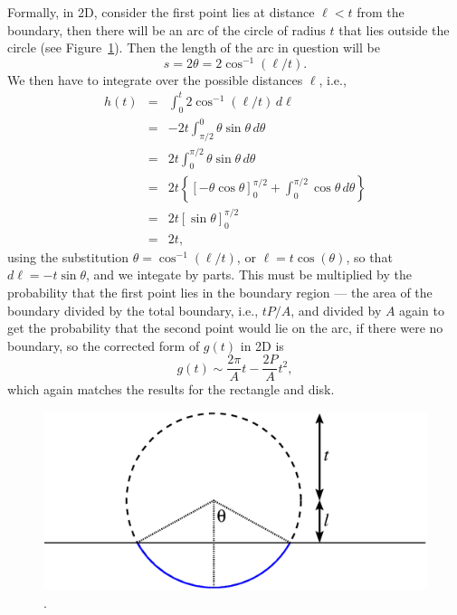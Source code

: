 Formally, in 2D, consider the first point lies at distance $\ell<t$
from the boundary, then there will be an arc of the circle of radius
$t$ that lies outside the circle (see
Figure~\ref{fig:perimeter}). Then the length of the arc in question
will be
\begin{equation}
  \label{eq:arc_len}
  s = 2 \theta = 2 \cos^{-1} (\ell / t).
\end{equation}
We then have to integrate over the possible distances $\ell$, i.e., 
\begin{eqnarray}
  \label{eq:correction_2nd_order}
   h(t) & = & \int_0^t 2 \cos^{-1} (\ell / t)  \, d\ell \nonumber \\
        & = &  - 2 t \int_{\pi/2}^0 \theta  \sin \theta \, d\theta  \nonumber \\
        & = &  2 t \int^{\pi/2}_0 \theta  \sin \theta \, d\theta  \nonumber \\
        & = &  2 t \left\{ \left[ -\theta  \cos \theta \right]^{\pi/2}_0 + 
                      \int^{\pi/2}_0  \cos \theta \, d\theta
                   \right\}  \nonumber \\
        & = &  2 t \left[ \sin \theta \right]^{\pi/2}_0  \nonumber \\
        & = &  2 t,
\end{eqnarray}
using the substitution $\theta = \cos^{-1} (\ell / t)$, or $\ell = t
\cos(\theta)$, so that $d \ell = - t \sin \theta$, and we integate by
parts. This must be multiplied by the probability that the first point
lies in the boundary region --- the area of the boundary divided by the
total boundary, i.e., $t P/A$, and divided by $A$ again to get the
probability that the second point would lie on the arc, if there were
no boundary, so the corrected form of $g(t)$ in 2D is
\begin{equation}
  g(t) \sim  \frac{2 \pi}{A} t - \frac{2 P}{A} t^2,
\end{equation}
which again matches the results for the rectangle and disk.

\begin{figure}[tbp]
  \begin{center}
    \includegraphics[width=0.33\columnwidth]{Figs/perimeter.eps}
    \caption{.}
    \label{fig:perimeter}
  \end{center} 
\vspace{-4mm}
\end{figure}

